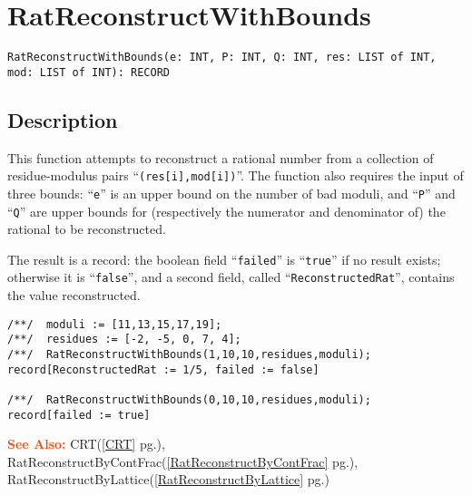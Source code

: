 \documentclass[a4paper]{mybook}
\newenvironment{command}{}{} %
\newcommand\SeeAlso{\par\textcolor{OrangeRed}{\textbf{\large See Also: }}}
\begin{document}
\section{RatReconstructWithBounds}
\label{RatReconstructWithBounds}
\begin{command} %


\begin{Verbatim}[label=syntax, rulecolor=\color{MidnightBlue},
frame=single]
RatReconstructWithBounds(e: INT, P: INT, Q: INT, res: LIST of INT, mod: LIST of INT): RECORD
\end{Verbatim}


\subsection*{Description}

This function attempts to reconstruct a rational number from a
collection of residue-modulus pairs ``\verb&(res[i],mod[i])&''.  The function
also requires the input of three bounds: ``\verb&e&'' is an upper bound on the
number of bad moduli, and ``\verb&P&'' and ``\verb&Q&'' are upper bounds for
(respectively the numerator and denominator of) the rational to be
reconstructed.
\par 
The result is a record: the boolean field ``\verb&failed&'' is ``\verb&true&''
if no result exists; otherwise it is ``\verb&false&'', and a second field,
called ``\verb&ReconstructedRat&'', contains the value reconstructed.
\begin{Verbatim}[label=example, rulecolor=\color{PineGreen}, frame=single]
/**/  moduli := [11,13,15,17,19];
/**/  residues := [-2, -5, 0, 7, 4];
/**/  RatReconstructWithBounds(1,10,10,residues,moduli);
record[ReconstructedRat := 1/5, failed := false]

/**/  RatReconstructWithBounds(0,10,10,residues,moduli);
record[failed := true]
\end{Verbatim}


\SeeAlso %
  CRT(\ref{CRT} pg.\pageref{CRT}), 
    RatReconstructByContFrac(\ref{RatReconstructByContFrac} pg.\pageref{RatReconstructByContFrac}), 
    RatReconstructByLattice(\ref{RatReconstructByLattice} pg.\pageref{RatReconstructByLattice})
\end{command} %
\end{document}
